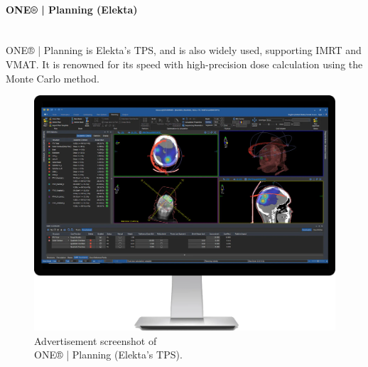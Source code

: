 \Needspace{5cm}
\begin{multicols}{2}
	\paragraph{ONE® | Planning (Elekta)}
	\ \\
	ONE® | Planning \cite{one_planning} is Elekta's TPS, and is also widely used, supporting IMRT and VMAT.
	It is renowned for its speed with high-precision dose calculation using the Monte Carlo method.
	
	\columnbreak
	
	\begin{figure}[H]
		\centering
		\captionsetup{width=\linewidth}
		\includegraphics[width=\linewidth]{OnePlanningElekta.png}
		\caption{Advertisement screenshot of \\ ONE® | Planning (Elekta's TPS).}
		\label{fig:screenshot_one_planning}
	\end{figure}
\end{multicols}

